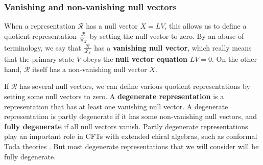 \documentclass[12pt, a4paper]{article}
\newcommand{\myindex}[1]{\textbf{\boldmath #1}}
\theoremstyle{break}
\begin{document}
\subsubsection{Vanishing and non-vanishing null vectors}

When a representation $\mathcal{R}$ has a null vector $X{}=LV{}$, this allows us to define a quotient representation $\frac{\mathcal{R}}{\mathcal{R}_{X{}}}$ by setting the null vector to zero. 
By an abuse of terminology, we say that $\frac{\mathcal{R}}{\mathcal{R}_{X{}}}$ has a \myindex{vanishing null vector}, which really means that the primary state $V{}$ obeys the \myindex{null vector equation} $LV{}=0$. On the other hand, $\mathcal{R}$ itself has a non-vanishing null vector $X{}$. 

If $\mathcal{R}$ has several null vectors, we can define various quotient representations by setting some null vectors to zero. A \myindex{degenerate representation} is a representation that has at least one vanishing null vector. A degenerate representation is partly degenerate if it has some non-vanishing null vectors, and \myindex{fully degenerate} if all null vectors vanish. Partly degenerate representations play an important role in CFTs with extended chiral algebras, such as conformal Toda theories \cite{fl07c}. But most degenerate representations that we will consider will be fully degenerate. 
\end{document}
